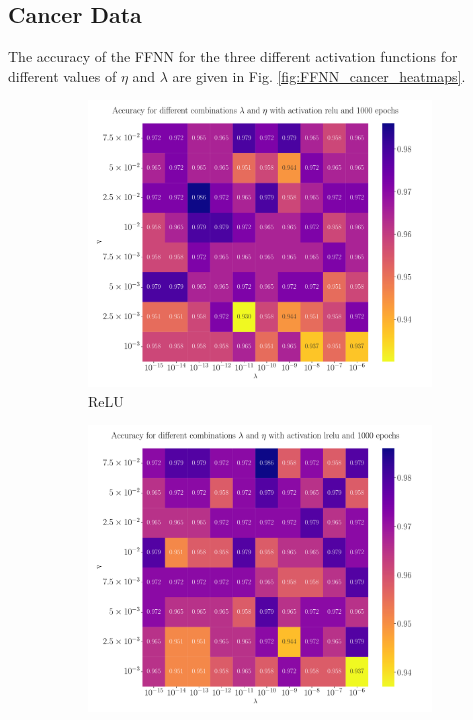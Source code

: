 \documentclass[%
reprint,
amsmath,amssymb,
aps,
]{revtex4-2}
\begin{document}
\subsection{Cancer Data}
The accuracy of the FFNN for the three different activation functions for different values of $\eta$ and $\lambda$ are given in Fig. \ref{fig:FFNN_cancer_heatmaps}.
\begin{figure}
	\begin{subfigure}{0.497\textwidth}
		\includegraphics[width=\textwidth]{Python/Figures/accuracy_heatmap_relu_epochs1000.pdf}
		\caption{ReLU}
		\label{fig:ReLU_heatmap}
	\end{subfigure}
	\hfill
	\begin{subfigure}{0.497\textwidth}
		\includegraphics[width=\textwidth]{Python/Figures/accuracy_heatmap_lrelu_epochs1000.pdf}

\end{subfigure}
\end{figure}
\end{document}
